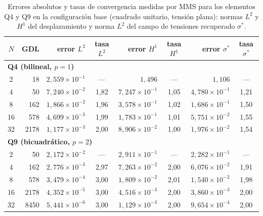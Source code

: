 \begin{table}[htbp]
\centering
\caption[Errores absolutos y tasas de convergencia medidas por MMS (configuración base).]{Errores absolutos y tasas de convergencia medidas por MMS para los elementos Q4 y Q9 en la configuración base (cuadrado unitario, tensión plana): normas $L^2$ y $H^1$ del desplazamiento y norma $L^2$ del campo de tensiones recuperado $\sigma^*$.}
\label{tab:mms}
\small
\setlength{\tabcolsep}{4pt}
\begin{tabular}{c r r c r c r c}
\hline
$N$ & GDL & error $L^2$ & tasa $L^2$ & error $H^1$ & tasa $H^1$ & error $\sigma^*$ & tasa $\sigma^*$ \\
\hline
\multicolumn{8}{l}{\textbf{Q4 (bilineal, $p=1$)}} \\
2  & 18   & $2{,}559\times10^{-1}$ & ---  & $1{,}496$               & ---  & $1{,}106$              & ---  \\
4  & 50   & $7{,}240\times10^{-2}$ & 1,82 & $7{,}247\times10^{-1}$  & 1,05 & $4{,}780\times10^{-1}$ & 1,21 \\
8  & 162  & $1{,}866\times10^{-2}$ & 1,96 & $3{,}578\times10^{-1}$  & 1,02 & $1{,}686\times10^{-1}$ & 1,50 \\
16 & 578  & $4{,}699\times10^{-3}$ & 1,99 & $1{,}783\times10^{-1}$  & 1,01 & $5{,}751\times10^{-2}$ & 1,55 \\
32 & 2178 & $1{,}177\times10^{-3}$ & 2,00 & $8{,}906\times10^{-2}$  & 1,00 & $1{,}976\times10^{-2}$ & 1,54 \\
\hline
\multicolumn{8}{l}{\textbf{Q9 (bicuadrático, $p=2$)}} \\
2  & 50   & $2{,}172\times10^{-2}$ & ---  & $2{,}911\times10^{-1}$  & ---  & $2{,}282\times10^{-1}$ & ---  \\
4  & 162  & $2{,}776\times10^{-3}$ & 2,97 & $7{,}263\times10^{-2}$  & 2,00 & $6{,}076\times10^{-2}$ & 1,91 \\
8  & 578  & $3{,}479\times10^{-4}$ & 3,00 & $1{,}809\times10^{-2}$  & 2,01 & $1{,}540\times10^{-2}$ & 1,98 \\
16 & 2178 & $4{,}352\times10^{-5}$ & 3,00 & $4{,}516\times10^{-3}$  & 2,00 & $3{,}860\times10^{-3}$ & 2,00 \\
32 & 8450 & $5{,}441\times10^{-6}$ & 3,00 & $1{,}129\times10^{-3}$  & 2,00 & $9{,}654\times10^{-4}$ & 2,00 \\
\hline
\end{tabular}
{\singlespacing{}}
\end{table}

